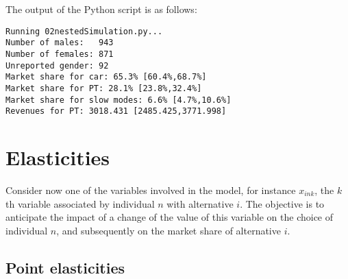 \documentclass[12pt,a4paper]{article}
\begin{document}
The output of the Python script is as follows:

\begin{lstlisting}
Running 02nestedSimulation.py...
Number of males:   943
Number of females: 871
Unreported gender: 92
Market share for car: 65.3% [60.4%,68.7%]
Market share for PT: 28.1% [23.8%,32.4%]
Market share for slow modes: 6.6% [4.7%,10.6%]
Revenues for PT: 3018.431 [2485.425,3771.998]
\end{lstlisting}

\section{Elasticities}
\label{sec:elasticities}
Consider now one of the variables involved in the model, for instance
$x_{ink}$, the $k$th variable associated by individual $n$ with
alternative $i$. The
objective is to anticipate the impact of a change of the value of this
variable on the choice of individual $n$,  and subsequently on the market share of
alternative $i$.

\subsection{Point elasticities}
\end{document}

